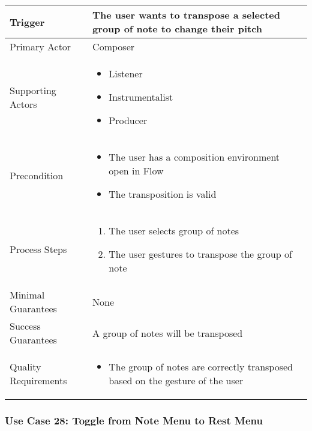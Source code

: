 \begin{tabularx}{\textwidth}{|X|X|}
\hline
Trigger & 
The user wants to transpose a selected group of note to change their pitch \\
\hline
Primary Actor & 
Composer \\
\hline
Supporting Actors & 
\begin{itemize}
\item Listener
\item Instrumentalist
\item Producer
\end{itemize} \\
\hline
Precondition & 
\begin{itemize}
\item The user has a composition environment open in Flow
\item The transposition is valid
\end{itemize} \\
\hline
Process Steps & 
\begin{enumerate}
\item The user selects group of notes
\item The user gestures to transpose the group of note
\end{enumerate} \\
\hline
Minimal Guarantees & 
None \\
\hline
Success Guarantees & 
A group of notes will be transposed \\
\hline
Quality Requirements & 
\begin{itemize}
\item The group of notes are correctly transposed based on the gesture of the user
\end{itemize} \\ 
\hline
\end{tabularx}

\subsubsection{Use Case 28: Toggle from Note Menu to Rest Menu}

